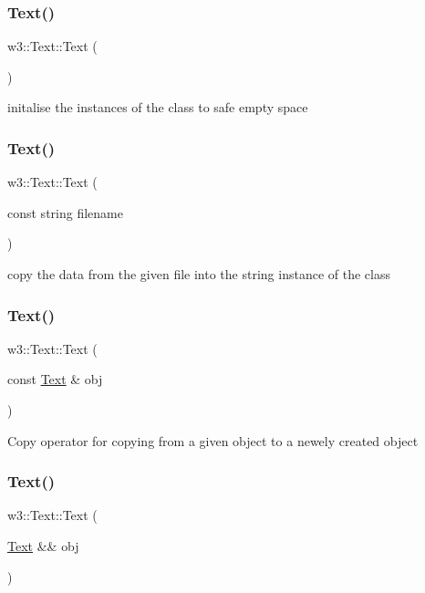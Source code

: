 \subsubsection{\texorpdfstring{Text()}{Text()}\hspace{0.1cm}{\footnotesize\ttfamily [1/4]}}
{\footnotesize\ttfamily w3\+::\+Text\+::\+Text (\begin{DoxyParamCaption}{ }\end{DoxyParamCaption})}

initalise the instances of the class to safe empty space \mbox{\label{classw3_1_1Text_a365bf91aafc082849a051a9bd0d1285b}} 
\subsubsection{\texorpdfstring{Text()}{Text()}\hspace{0.1cm}{\footnotesize\ttfamily [2/4]}}
{\footnotesize\ttfamily w3\+::\+Text\+::\+Text (\begin{DoxyParamCaption}\item[{const string}]{filename }\end{DoxyParamCaption})}

copy the data from the given file into the string instance of the class \mbox{\label{classw3_1_1Text_ac5b14dd6e2d9ee9876ea8501d75d1a10}} 
\subsubsection{\texorpdfstring{Text()}{Text()}\hspace{0.1cm}{\footnotesize\ttfamily [3/4]}}
{\footnotesize\ttfamily w3\+::\+Text\+::\+Text (\begin{DoxyParamCaption}\item[{const \mbox{\hyperlink{classw3_1_1Text}{Text}} \&}]{obj }\end{DoxyParamCaption})}

Copy operator for copying from a given object to a newely created object \mbox{\label{classw3_1_1Text_ad3f20b7b4394c26c0a2addcbf77e58fb}} 
\subsubsection{\texorpdfstring{Text()}{Text()}\hspace{0.1cm}{\footnotesize\ttfamily [4/4]}}
{\footnotesize\ttfamily w3\+::\+Text\+::\+Text (\begin{DoxyParamCaption}\item[{\mbox{\hyperlink{classw3_1_1Text}{Text}} \&\&}]{obj }\end{DoxyParamCaption})}

